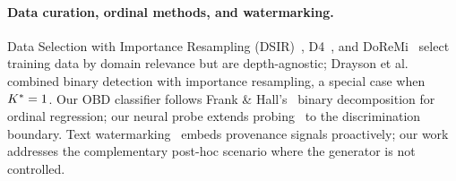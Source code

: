 \paragraph{Data curation, ordinal methods, and watermarking.}
Data Selection with Importance Resampling (DSIR)~\cite{xie2023dsir}, D4~\cite{tirumala2023d4}, and DoReMi~\cite{xie2023doremi} select training data by domain relevance but are depth-agnostic; Drayson et al.~\cite{drayson2025} combined binary detection with importance resampling, a special case when ${K^*} = 1$.
Our OBD classifier follows Frank \& Hall's~\cite{frank2001ordinal} binary decomposition for ordinal regression; our neural probe extends probing~\cite{alain2017understanding, belinkov2022probing} to the discrimination boundary.
Text watermarking~\cite{kirchenbauer2023watermark} embeds provenance signals proactively; our work addresses the complementary post-hoc scenario where the generator is not controlled.

